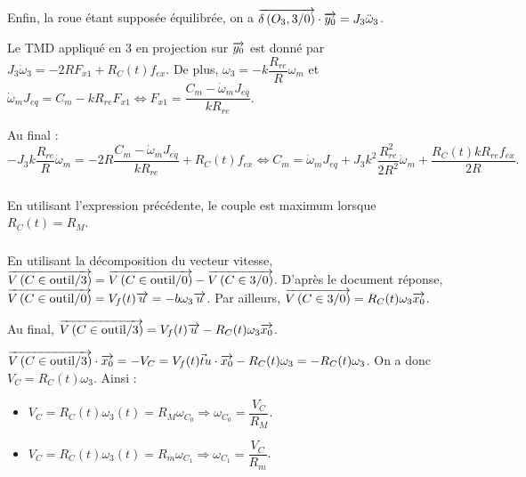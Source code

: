 \documentclass[10pt,fleqn]{article} %
\begin{document}
Enfin, la roue étant supposée équilibrée, on a $\overrightarrow{\delta \left( {O_3}, {3} /{0}\right)}\cdot\overrightarrow{y_0}=J_3\ddot{\omega}_3$.


Le TMD appliqué en 3 en projection sur $\overrightarrow{y_0}$  est donné par 
$J_3\ddot{\omega}_3=-2RF_{x1}+R_C(t) f_{ex}$. De plus, 
$\omega_3= -k\dfrac{R_{re}}{R}\omega_m$ et 
$\dot{\omega}_m J_{eq}= C_m-kR_{re}F_{x1} \Leftrightarrow F_{x1}= \dfrac{C_m-\dot{\omega}_m J_{eq}}{kR_{re}}$.

Au final :
$$-J_3k\dfrac{R_{re}}{R}\dot{\omega}_m=-2R\dfrac{C_m-\dot{\omega}_m J_{eq}}{kR_{re}}+R_C(t) f_{ex} \Leftrightarrow
C_m=\dot{\omega}_m J_{eq}
+J_3k^2\dfrac{R_{re}^2}{2R^2}\dot{\omega}_m+ \dfrac{R_C(t) kR_{re} f_{ex}}{2R}.$$

%
%
%
% 

\subparagraph{}
En utilisant l'expression précédente, le couple est maximum lorsque $R_C(t)=R_M$.

\subparagraph{}
En utilisant la décomposition du vecteur vitesse, 
$\overrightarrow{V\left( {C} \in {\text{outil}}/{3}\right)}=\overrightarrow{V\left( {C} \in {\text{outil}}/{0}\right)}-\overrightarrow{V\left( {C} \in {\text{3}}/{0}\right)}$. 
D'après le document réponse, $\overrightarrow{V\left( {C} \in {\text{outil}}/{0}\right)}=V_f(t)\overrightarrow{u}=-b\omega_3\overrightarrow{u}$. Par ailleurs, $\overrightarrow{V\left( {C} \in {\text{3}}/{0}\right)}=R_C(t)\omega_3\overrightarrow{x_0}$.

Au final, $\overrightarrow{V\left( {C} \in {\text{outil}}/{3}\right)}=V_f(t)\overrightarrow{u}-R_C(t)\omega_3\overrightarrow{x_0}$.

$\overrightarrow{V\left( {C} \in {\text{outil}}/{3}\right)} \cdot \overrightarrow{x_0} = -V_C =  V_f(t)\vec t{u}\cdot \overrightarrow{x_0}-R_C(t)\omega_3 = -R_C(t)\omega_3$. On a donc $V_C=R_C(t)\omega_3$. Ainsi : 
\begin{itemize}
\item $V_C=R_C(t)\omega_3(t)=R_M \omega_{C_0}\Rightarrow \omega_{C_0}=\dfrac{V_C}{R_M}$.
\item $V_C=R_C(t)\omega_3(t)=R_m \omega_{C_1}\Rightarrow \omega_{C_1}=\dfrac{V_C}{R_m}$.
\end{itemize}
 
 \subparagraph{}
 
\end{document}
